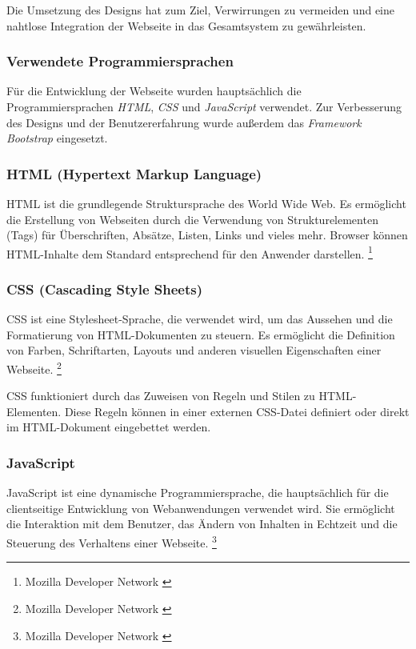 \begin{itemize}
Die Umsetzung des Designs hat zum Ziel, Verwirrungen zu vermeiden und eine nahtlose Integration der Webseite in das Gesamtsystem zu gewährleisten.

\subsubsection{Verwendete Programmiersprachen}
Für die Entwicklung der Webseite wurden hauptsächlich die Programmiersprachen \textit{HTML}, \textit{CSS} und \textit{JavaScript} verwendet. Zur Verbesserung des Designs und der Benutzererfahrung wurde außerdem das \textit{Framework Bootstrap} eingesetzt.

\subsubsection*{HTML (Hypertext Markup Language)}
HTML ist die grundlegende Struktursprache des World Wide Web. Es ermöglicht die Erstellung von Webseiten durch die Verwendung von Strukturelementen (Tags) für Überschriften, Absätze, Listen, Links und vieles mehr. Browser können HTML-Inhalte dem Standard entsprechend für den Anwender darstellen.
\footnote{Mozilla Developer Network \cite{HTML}}

\subsubsection*{CSS (Cascading Style Sheets)}
CSS ist eine Stylesheet-Sprache, die verwendet wird, um das Aussehen und die Formatierung von HTML-Dokumenten zu steuern. Es ermöglicht die Definition von Farben, Schriftarten, Layouts und anderen visuellen Eigenschaften einer Webseite. \footnote{Mozilla Developer Network \cite{CSS}}

CSS funktioniert durch das Zuweisen von Regeln und Stilen zu HTML-Elementen. Diese Regeln können in einer externen CSS-Datei definiert oder direkt im HTML-Dokument eingebettet werden.

\subsubsection*{JavaScript}
JavaScript ist eine dynamische Programmiersprache, die hauptsächlich für die clientseitige Entwicklung von Webanwendungen verwendet wird. Sie ermöglicht die Interaktion mit dem Benutzer, das Ändern von Inhalten in Echtzeit und die Steuerung des Verhaltens einer Webseite. \footnote{Mozilla Developer Network \cite{Javascript}}


\end{itemize}
